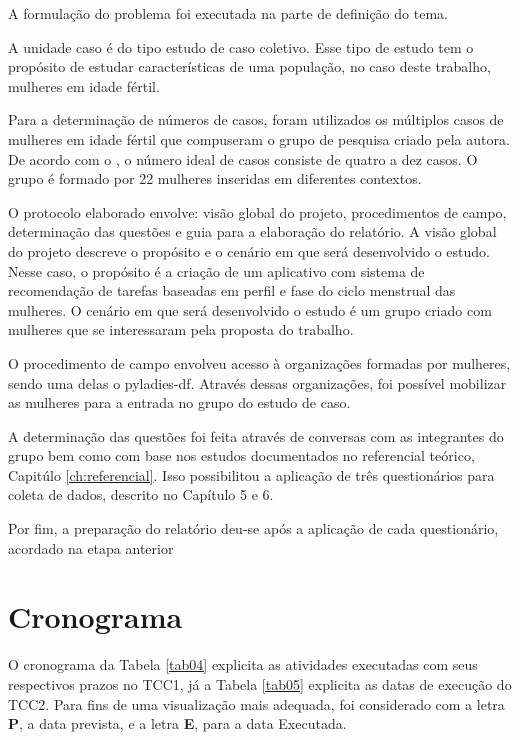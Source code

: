 A formulação do problema foi executada na parte de definição do tema.

A unidade caso é do tipo estudo de caso coletivo. Esse tipo de estudo tem o propósito de estudar características
de uma população, no caso deste trabalho, mulheres em idade fértil.

Para a determinação de números de casos, foram utilizados os múltiplos casos de mulheres em idade fértil que compuseram o grupo de pesquisa criado pela autora. De acordo com o , 
o número ideal de casos consiste de quatro a dez casos. O grupo é formado por 22 mulheres inseridas em diferentes contextos.

O protocolo elaborado envolve: visão global do projeto, procedimentos de campo, determinação das questões e guia para a elaboração do relatório.
A visão global do projeto descreve o propósito e o cenário em que será desenvolvido o estudo. Nesse caso, o propósito é a criação de um aplicativo com sistema de recomendação de tarefas baseadas 
em perfil e fase do ciclo menstrual das mulheres. O cenário em que será desenvolvido o estudo é um grupo criado com mulheres que se interessaram pela proposta do trabalho.

O procedimento de campo envolveu acesso à organizações formadas por mulheres, sendo uma delas o pyladies-df. Através dessas organizações, foi possível mobilizar as mulheres 
para a entrada no grupo do estudo de caso.

A determinação das questões foi feita através de conversas com as 
integrantes do grupo bem como com base nos estudos documentados no 
referencial teórico, Capitúlo \ref{ch:referencial}. Isso possibilitou a aplicação de 
três questionários para coleta de dados, descrito no Capítulo 5 e 6.

Por fim, a preparação do relatório deu-se após a aplicação de cada questionário, acordado na etapa anterior

\section{Cronograma}

O cronograma da Tabela \ref{tab04} explicita as atividades executadas com seus 
respectivos prazos no TCC1, já a Tabela \ref{tab05} 
explicita as datas de execução do TCC2.
Para fins de uma visualização mais adequada, foi considerado com a letra \textbf{P}, a
data prevista, e a letra \textbf{E}, para a data Executada.

